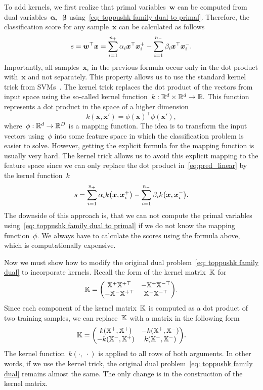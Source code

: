 To add kernels, we first realize that primal variables~$\bm{w}$ can be computed from dual variables~$\bm{\alpha},$~$\bm{\beta}$ using~\eqref{eq: toppushk family dual to primal}. Therefore, the classification score for any sample~$\bm{x}$ can be calculated as follows
\begin{equation}\label{eq:pred_linear}
  s
    = \bm{w}^{\top} \bm{x}
    = \sum_{i = 1}^{n_{+}} \alpha_i \bm{x}^{\top} \bm{x}_i^+ - \sum_{i = 1}^{n_{-}} \beta_i \bm{x}^{\top} \bm{x}_i^-.
\end{equation}
Importantly, all samples~$\bm{x}_i$ in the previous formula occur only in the dot product with~$\bm{x}$ and not separately. This property allows us to use the standard kernel trick from SVMs~\cite{cortes1995support}. The kernel trick replaces the dot product of the vectors from input space using the so-called kernel function~$k: \mathbb{R}^d \times \mathbb{R}^d \to \mathbb{R}.$ This function represents a dot product in the space of a higher dimension
\begin{equation*}
  k(\bm{x}, \bm{x}') = \phi(\bm{x})^{\top} \phi(\bm{x}'),
\end{equation*}
where~$\phi: \mathbb{R}^d \to \mathbb{R}^D$ is a mapping function. The idea is to transform the input vectors using~$\phi$ into some feature space in which the classification problem is easier to solve. However, getting the explicit formula for the mapping function is usually very hard. The kernel trick allows us to avoid this explicit mapping to the feature space since we can only replace the dot product in~\eqref{eq:pred_linear} by the kernel function~$k$
\begin{equation}\label{eq: dual scores kernel}
  s = \sum_{i = 1}^{\npos} \alpha_i k\Brac{\bm{x}, \bm{x}^+_i} - \sum_{i = 1}^{\nneg} \beta_i k\Brac{\bm{x}, \bm{x}^-_i}.
\end{equation}
The downside of this approach is, that we can not compute the primal variables using~\eqref{eq: toppushk family dual to primal} if we do not know the mapping function~$\phi.$ We always have to calculate the scores using the formula above, which is computationally expensive.

Now we must show how to modify the original dual problem~\eqref{eq: toppushk family dual} to incorporate kernels. Recall the form of the kernel matrix~$\mathbb{K}$ for \TopPushK
\begin{equation*}
  \K
    = \Matrix{\X^+ \X^{+\top} & -\X^+ \X^{-\top} \\ -\X^- \X^{+\top} & \X^- \X^{-\top}}.
\end{equation*}
Since each component of the kernel matrix~$\mathbb{K}$ is computed as a dot product of two training samples, we can replace~$\mathbb{K}$ with a matrix in the following form
\begin{equation}\label{eq: kernel matrix nonlinear}
  \K = \Matrix{k\Brac{\X^+, \X^{+}} & -k\Brac{\X^+, \X^{-}} \\ -k\Brac{\X^-, \X^{+}} & k\Brac{\X^-, \X^{-}}}.
\end{equation}
The kernel function~$k(\cdot,\; \cdot)$ is applied to all rows of both arguments. In other words, if we use the kernel trick, the original dual problem~\eqref{eq: toppushk family dual} remains almost the same. The only change is in the construction of the kernel matrix.

